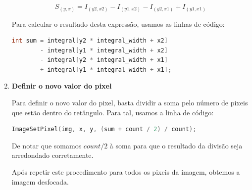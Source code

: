 \begin{enumerate}
{\begin{equation}
    S_{(y,x)} = I_{(y2,x2)} - I_{(y1,x2)} - I_{(y2,x1)} + I_{(y1,x1)}
\end{equation}\label{eq:equacao-para-soma}

Para calcular o resultado desta expressão, usamos as linhas de código:

\begin{lstlisting}[language=C]
    int sum = integral[y2 * integral_width + x2]
        - integral[y1 * integral_width + x2]
        - integral[y2 * integral_width + x1]
        + integral[y1 * integral_width + x1];
\end{lstlisting}
}

\item {
\textbf{Definir o novo valor do pixel}

Para definir o novo valor do pixel, basta dividir a soma pelo número de pixeis que estão dentro do retângulo. Para tal, usamos a linha de código:

\begin{lstlisting}[language=C]
    ImageSetPixel(img, x, y, (sum + count / 2) / count);
\end{lstlisting}

De notar que somamos $count/2$ à soma para que o resultado da divisão seja arredondado corretamente.
}

Após repetir este procedimento para todos os pixeis da imagem, obtemos a imagem desfocada.
\end{enumerate}
